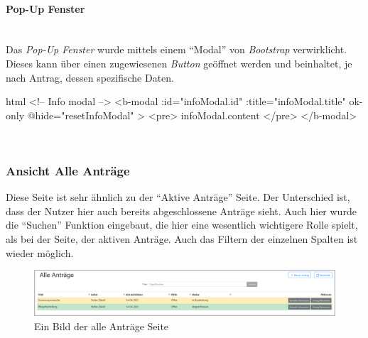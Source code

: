 \paragraph{Pop-Up Fenster}
~\\
Das \textit{Pop-Up Fenster} wurde mittels einem \enquote{Modal} von \textit{Bootstrap} verwirklicht. Dieses kann über einen zugewiesenen \textit{Button} geöffnet werden und beinhaltet, je nach Antrag, dessen spezifische Daten.
\begin{code}{html}
	<!-- Info modal -->
    <b-modal
      :id="infoModal.id"
      :title="infoModal.title"
      ok-only
      @hide="resetInfoModal"
    >
      <pre>{{ infoModal.content }}</pre>
    </b-modal>
\end{code}
	\label{list:codepopup} ~\\

\subsubsection{Ansicht Alle Anträge}
\label{chapter:implementierung-frontend-komponenten-alle}
Diese Seite ist sehr ähnlich zu der \enquote{Aktive Anträge} Seite. Der Unterschied ist, dass der Nutzer hier auch bereits abgeschlossene Anträge sieht. Auch hier wurde die \enquote{Suchen} Funktion eingebaut, die hier eine wesentlich wichtigere Rolle spielt, als bei der Seite, der aktiven Anträge. Auch das Filtern der einzelnen Spalten ist wieder möglich.
\begin{figure}[H]
	\centering
	\includegraphics[width=1\linewidth]{images/ldehner_implementierung/alle}
	\caption[Alle Anträge Seite]{Ein Bild der alle Anträge Seite}
	\label{fig:antragalle}
\end{figure}
~\\

\newpage
